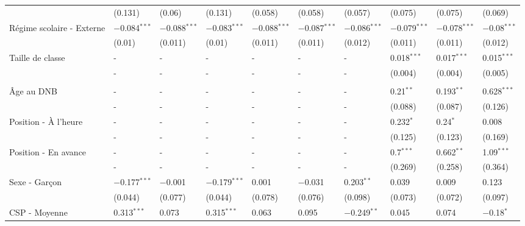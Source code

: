 \documentclass[
]{book}
\begin{document}
\begin{ThreePartTable}
\begin{longtable}[t]{llllllllll}
\hspace{1em} & (0.131) & (0.06) & (0.131) & (0.058) & (0.058) & (0.057) & (0.075) & (0.075) & (0.069)\\
\hspace{1em}Régime scolaire - Externe & $-$0.084$^{***}$ & $-$0.088$^{***}$ & $-$0.083$^{***}$ & $-$0.088$^{***}$ & $-$0.087$^{***}$ & $-$0.086$^{***}$ & $-$0.079$^{***}$ & $-$0.078$^{***}$ & $-$0.08$^{***}$\\
\hspace{1em} & (0.01) & (0.011) & (0.01) & (0.011) & (0.011) & (0.012) & (0.011) & (0.011) & (0.012)\\
\hspace{1em}Taille de classe & - & - & - & - & - & - & 0.018$^{***}$ & 0.017$^{***}$ & 0.015$^{***}$\\
\hspace{1em} & - & - & - & - & - & - & (0.004) & (0.004) & (0.005)\\
\addlinespace[0.3em]
\multicolumn{10}{l}{\textbf{Moyennes chez les pairs}}\\
\hspace{1em}Âge au DNB & - & - & - & - & - & - & 0.21$^{**}$ & 0.193$^{**}$ & 0.628$^{***}$\\
\hspace{1em} & - & - & - & - & - & - & (0.088) & (0.087) & (0.126)\\
\hspace{1em}Position - À l'heure & - & - & - & - & - & - & 0.232$^{*}$ & 0.24$^{*}$ & 0.008\\
\hspace{1em} & - & - & - & - & - & - & (0.125) & (0.123) & (0.169)\\
\hspace{1em}Position - En avance & - & - & - & - & - & - & 0.7$^{***}$ & 0.662$^{**}$ & 1.09$^{***}$\\
\hspace{1em} & - & - & - & - & - & - & (0.269) & (0.258) & (0.364)\\
\hspace{1em}Sexe - Garçon & $-$0.177$^{***}$ & $-$0.001 & $-$0.179$^{***}$ & 0.001 & $-$0.031 & 0.203$^{**}$ & 0.039 & 0.009 & 0.123\\
\hspace{1em} & (0.044) & (0.077) & (0.044) & (0.078) & (0.076) & (0.098) & (0.073) & (0.072) & (0.097)\\
\hspace{1em}CSP - Moyenne & 0.313$^{***}$ & 0.073 & 0.315$^{***}$ & 0.063 & 0.095 & $-$0.249$^{**}$ & 0.045 & 0.074 & $-$0.18$^{*}$\\

\end{longtable}
\end{ThreePartTable}
\end{document}
